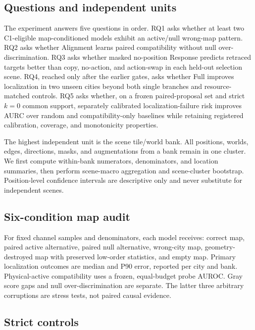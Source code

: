 \documentclass{article}
\begin{document}
\subsection{Questions and independent units}

The experiment answers five questions in order.  RQ1 asks whether at least two
C1-eligible map-conditioned models exhibit an active/null wrong-map pattern.  RQ2
asks whether Alignment learns paired compatibility without null
over-discrimination.  RQ3 asks whether masked no-position Response predicts
retraced targets better than copy, no-action, and action-swap in each held-out
selection scene.  RQ4, reached only after the earlier gates, asks whether Full
improves localization in two unseen cities beyond both single branches and
resource-matched controls.  RQ5 asks whether, on a frozen paired-proposal set
and strict $k=0$ common support, separately calibrated localization-failure
risk improves AURC over random and compatibility-only baselines while retaining
registered calibration, coverage, and monotonicity properties.

The highest independent unit is the scene tile/world bank.  All positions,
worlds, edges, directions, masks, and augmentations from a bank remain in one
cluster.  We first compute within-bank numerators, denominators, and location
summaries, then perform scene-macro aggregation and scene-cluster bootstrap.
Position-level confidence intervals are descriptive only and never substitute
for independent scenes.

\subsection{Six-condition map audit}

For fixed channel samples and denominators, each model receives: correct map,
paired active alternative, paired null alternative, wrong-city map,
geometry-destroyed map with preserved low-order statistics, and empty map.
Primary localization outcomes are median and P90 error, reported per city and
bank.  Physical-active compatibility uses a frozen, equal-budget probe AUROC.  Gray
score gaps and null over-discrimination are separate.  The latter three
arbitrary corruptions are stress tests, not paired causal evidence.

\subsection{Strict controls}
\end{document}
